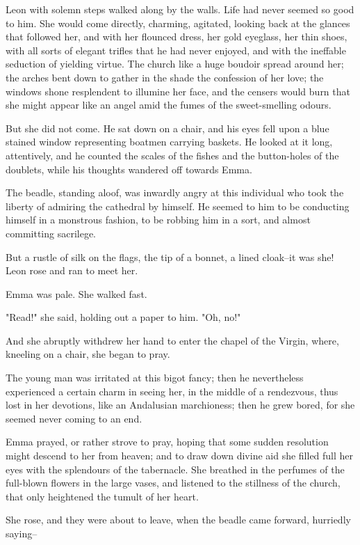 \documentclass[11pt,twocolumn]{ltugboat}
\begin{document}
Leon with solemn steps walked along by the walls. Life had never seemed
so good to him. She would come directly, charming, agitated, looking
back at the glances that followed her, and with her flounced dress, her
gold eyeglass, her thin shoes, with all sorts of elegant trifles that he
had never enjoyed, and with the ineffable seduction of yielding virtue.
The church like a huge boudoir spread around her; the arches bent down
to gather in the shade the confession of her love; the windows shone
resplendent to illumine her face, and the censers would burn that she
might appear like an angel amid the fumes of the sweet-smelling odours.

But she did not come. He sat down on a chair, and his eyes fell upon a
blue stained window representing boatmen carrying baskets. He looked at
it long, attentively, and he counted the scales of the fishes and the
button-holes of the doublets, while his thoughts wandered off towards
Emma.

The beadle, standing aloof, was inwardly angry at this individual who
took the liberty of admiring the cathedral by himself. He seemed to him
to be conducting himself in a monstrous fashion, to be robbing him in a
sort, and almost committing sacrilege.

But a rustle of silk on the flags, the tip of a bonnet, a lined
cloak--it was she! Leon rose and ran to meet her.

Emma was pale. She walked fast.

"Read!" she said, holding out a paper to him. "Oh, no!"

And she abruptly withdrew her hand to enter the chapel of the Virgin,
where, kneeling on a chair, she began to pray.

The young man was irritated at this bigot fancy; then he nevertheless
experienced a certain charm in seeing her, in the middle of a
rendezvous, thus lost in her devotions, like an Andalusian marchioness;
then he grew bored, for she seemed never coming to an end.

Emma prayed, or rather strove to pray, hoping that some sudden
resolution might descend to her from heaven; and to draw down divine
aid she filled full her eyes with the splendours of the tabernacle. She
breathed in the perfumes of the full-blown flowers in the large vases,
and listened to the stillness of the church, that only heightened the
tumult of her heart.

She rose, and they were about to leave, when the beadle came forward,
hurriedly saying--
\end{document}
